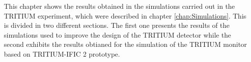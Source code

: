 This chapter shows the results obtained in the simulations carried out in the TRITIUM experiment, which were described in chapter \ref{chap:Simulations}. This is divided in two different sections. The first one presents the results of the simulations used to improve the design of the TRITIUM detector while the second exhibits the results obtianed for the simulation of the TRITIUM monitor based on TRITIUM-IFIC 2 prototype.